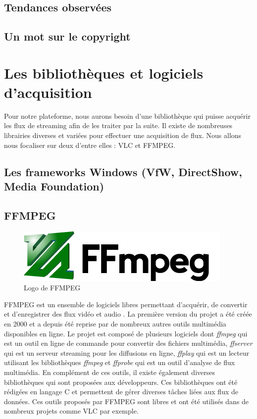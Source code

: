 \documentclass{polytech/polytech}
\begin{document}
\section{Tendances observées}


\section{Un mot sur le copyright}


\chapter{Les bibliothèques et logiciels d'acquisition}

Pour notre plateforme, nous aurons besoin d’une bibliothèque qui puisse acquérir les flux de streaming afin de les traiter par la suite. Il existe de nombreuses librairies diverses et variées pour effectuer une acquisition de flux. Nous allons nous focaliser sur deux d’entre elles : VLC et FFMPEG.

\section{Les frameworks Windows (VfW, DirectShow, Media Foundation)}


\section{FFMPEG}

\begin{figure}
	\includegraphics[scale=0.5]{images/ffmpeg}
	\caption{Logo de FFMPEG}
	\label{fig:logoffmpeg}
\end{figure}

FFMPEG est un ensemble de logiciels libres permettant d’acquérir, de convertir et d’enregistrer des flux vidéo et audio \cite{_ffmpeg_2017}. La première version du projet a été créée en 2000 et a depuis été reprise par de nombreux autres outils multimédia disponibles en ligne. Le projet est composé de plusieurs logiciels dont \textit{ffmpeg} qui est un outil en ligne de commande pour convertir des fichiers multimédia, \textit{ffserver} qui est un serveur streaming pour les diffusions en ligne, \textit{ffplay} qui est un lecteur utilisant les bibliothèques \textit{ffmpeg} et \textit{ffprobe} qui est un outil d’analyse de flux multimédia. En complément de ces outils, il existe également diverses bibliothèques qui sont proposées aux développeurs. Ces bibliothèques ont été rédigées en langage C et permettent de gérer diverses tâches liées aux flux de données. Ces outils proposés par FFMPEG sont libres et ont été utilisés dans de nombreux projets comme VLC par exemple.
\end{document}
